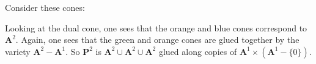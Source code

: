 \documentclass [11 pt, oneside] {article}
\begin{document}
Consider these cones:
\begin{center}
\end{center}
Looking at the dual cone, one sees that the orange and blue cones correspond to $\mathbf{A}^2$.  Again, one sees that the green and orange cones are glued together by the variety $\mathbf{A}^2 - \mathbf{A}^1$. So $\mathbf{P}^2$ is $\mathbf{A}^2\cup \mathbf{A}^2\cup \mathbf{A}^2$ glued along copies of $\mathbf{A}^1\times (\mathbf{A}^1-\{0\})$.
\end{document}
